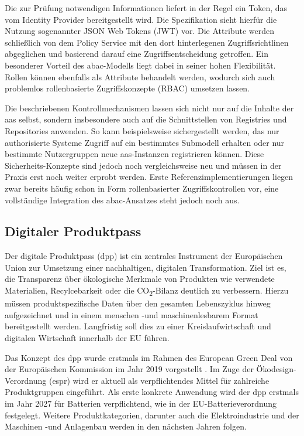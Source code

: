 Die zur Prüfung notwendigen Informationen liefert in der Regel ein Token, das vom Identity Provider bereitgestellt wird. Die Spezifikation sieht hierfür die Nutzung sogenannter JSON Web Tokens (JWT) vor.
Die Attribute werden schließlich von dem Policy Service mit den dort hinterlegenen Zugriffsrichtlinen abgeglichen und basierend darauf eine Zugriffsentscheidung getroffen.
Ein besonderer Vorteil des \acs{abac}-Modells liegt dabei in seiner hohen Flexibilität. Rollen können ebenfalls als Attribute behandelt werden, wodurch sich auch problemlos rollenbasierte Zugriffskonzepte (RBAC) umsetzen lassen. 

Die beschriebenen Kontrollmechanismen lassen sich nicht nur auf die Inhalte der \acs{aas} selbst, sondern insbesondere auch auf die Schnittstellen von Registries und Repositories anwenden.
So kann beispielsweise sichergestellt werden, das nur authorisierte Systeme Zugriff auf ein bestimmtes Submodell erhalten oder nur bestimmte Nutzergruppen neue \acs{aas}-Instanzen registrieren können.
Diese Sicherheits-Konzepte sind jedoch noch vergleichsweise neu und müssen in der Praxis erst noch weiter erprobt werden.
Erste Referenzimplementierungen liegen zwar bereits häufig schon in Form rollenbasierter Zugriffskontrollen vor, eine vollständige Integration des \acs{abac}-Ansatzes steht jedoch noch aus.


\subsection{Digitaler Produktpass}
Der digitale Produktpass (\acs{dpp}) ist ein zentrales Instrument der Europäischen Union zur Umsetzung einer nachhaltigen, digitalen Transformation.
Ziel ist es, die Transparenz über ökologische Merkmale von Produkten wie verwendete Materialien, Recylcebarkeit oder die CO\textsubscript{2}-Bilanz deutlich zu verbessern.
Hierzu müssen produktspezifische Daten über den gesamten Lebenszyklus hinweg aufgezeichnet und in einem menschen -und maschinenlesbarem Format bereitgestellt werden.
Langfristig soll dies zu einer Kreislaufwirtschaft und digitalen Wirtschaft innerhalb der EU führen.

Das Konzept des \acs{dpp} wurde erstmals im Rahmen des European Green Deal von der Europäischen Kommission im Jahr 2019 vorgestellt \cite{GreenDeal}.
Im Zuge der Ökodesign-Verordnung (\ac{espr}) \cite{ESPR} wird er aktuell als verpflichtendes Mittel für zahlreiche Produktgruppen eingeführt.
Als erste konkrete Anwendung wird der \acs{dpp} erstmals im Jahr 2027 für Batterien verpflichtend, wie in der EU-Batterieverordnung festgelegt.
Weitere Produktkategorien, darunter auch die Elektroindustrie und der Maschinen -und Anlagenbau werden in den nächsten Jahren folgen.

